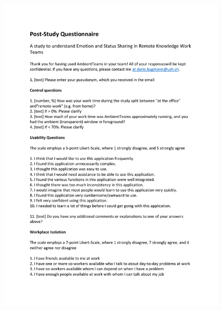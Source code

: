 \begin{figure}[h]
    \centering
    \includegraphics[width=\linewidth, page=2]{./documents/Poststudy_Questionnaire.pdf}
\end{figure}

